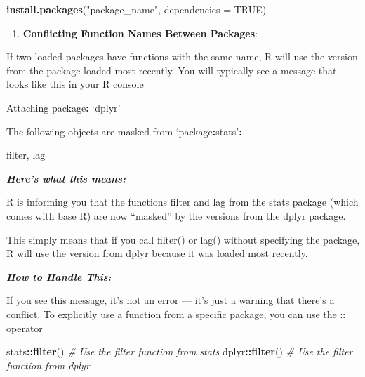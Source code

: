 \documentclass[
]{book}
\newenvironment{Shaded}{\begin{snugshade}}{\end{snugshade}}
\newcommand{\AttributeTok}[1]{\textcolor[rgb]{0.13,0.29,0.53}{#1}}
\newcommand{\CommentTok}[1]{\textcolor[rgb]{0.56,0.35,0.01}{\textit{#1}}}
\newcommand{\ConstantTok}[1]{\textcolor[rgb]{0.56,0.35,0.01}{#1}}
\newcommand{\FunctionTok}[1]{\textcolor[rgb]{0.13,0.29,0.53}{\textbf{#1}}}
\newcommand{\NormalTok}[1]{#1}
\newcommand{\SpecialCharTok}[1]{\textcolor[rgb]{0.81,0.36,0.00}{\textbf{#1}}}
\newcommand{\StringTok}[1]{\textcolor[rgb]{0.31,0.60,0.02}{#1}}
\providecommand{\tightlist}{%
  \setlength{\itemsep}{0pt}\setlength{\parskip}{0pt}}
\begin{document}
\begin{Shaded}
\begin{Highlighting}[]
\FunctionTok{install.packages}\NormalTok{(}\StringTok{"package\_name"}\NormalTok{, }\AttributeTok{dependencies =} \ConstantTok{TRUE}\NormalTok{)}
\end{Highlighting}
\end{Shaded}

\begin{enumerate}
\def\labelenumi{\arabic{enumi}.}
\setcounter{enumi}{3}
\tightlist
\item
  \textbf{Conflicting Function Names Between Packages}:
\end{enumerate}

If two loaded packages have functions with the same name, R will use the version from the package loaded most recently. You will typically see a message that looks like this in your R console

\begin{Shaded}
\begin{Highlighting}[]
\NormalTok{Attaching package}\SpecialCharTok{:}\NormalTok{ ‘dplyr’}

\NormalTok{The following objects are masked from ‘package}\SpecialCharTok{:}\NormalTok{stats’}\SpecialCharTok{:}

\NormalTok{    filter, lag}
\end{Highlighting}
\end{Shaded}

\textbf{\emph{Here's what this means:}}

R is informing you that the functions filter and lag from the stats package (which comes with base R) are now ``masked'' by the versions from the dplyr package.

This simply means that if you call filter() or lag() without specifying the package, R will use the version from dplyr because it was loaded most recently.

\textbf{\emph{How to Handle This:}}

If you see this message, it's not an error --- it's just a warning that there's a conflict. To explicitly use a function from a specific package, you can use the :: operator

\begin{Shaded}
\begin{Highlighting}[]
\NormalTok{stats}\SpecialCharTok{::}\FunctionTok{filter}\NormalTok{()  }\CommentTok{\# Use the filter function from stats}
\NormalTok{dplyr}\SpecialCharTok{::}\FunctionTok{filter}\NormalTok{()  }\CommentTok{\# Use the filter function from dplyr}
\end{Highlighting}
\end{Shaded}
\end{document}
